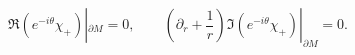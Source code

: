 \begin{equation}
\Re \left( e^{-i\theta} \chi_+ \right) |_{\partial M}=0,
\qquad \left( \partial_r +\frac 1r \right) \Im
\left( e^{-i\theta} \chi_+ \right) |_{\partial M}=0.
\label{bcchip}
\end{equation}

